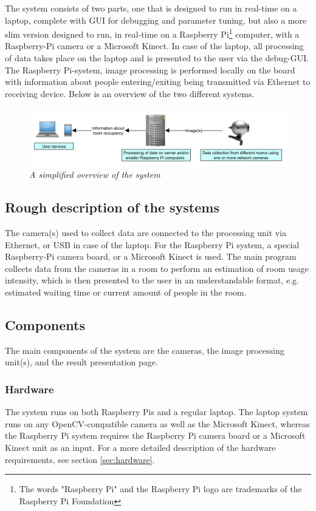 The system consists of two parts, one that is designed to run in real-time on a laptop, complete with GUI for debugging and parameter tuning, but also a more slim version designed to run, in real-time on a Raspberry Pi\footnote{The words "Raspberry Pi" and the Raspberry Pi logo are trademarks of the Raspberry Pi Foundation} computer, with a Raspberry-Pi camera or a Microsoft Kinect. In case of the laptop, all processing of data takes place on the laptop and is presented to the user via the debug-GUI. The Raspberry Pi-system, image processing is performed locally on the board with information about people entering/exiting being transmitted via Ethernet to receiving device. Below is an overview of the two different systems.

\vspace{0.5cm}
\begin{figure}[htb]
	\centering
	\includegraphics[width=170mm]{images/system_overview.png}
	\caption[System overview]{\textit{A simplified overview of the system}}
	\label{fig:block_overview2_fig}  %
\end{figure}

\subsection{Rough description of the systems}
The camera(s) used to collect data are connected to the processing unit via Ethernet, or USB in case of the laptop. For the Raspberry Pi system, a special Raspberry-Pi camera board, or a Microsoft Kinect is used. The main program collects data from the cameras in a room to perform an estimation of room usage intensity, which is then presented to the user in an understandable format, e.g. estimated waiting time or current amount of people in the room.
\newpage
\subsection{Components}
The main components of the system are the cameras, the image processing unit(s), and the result presentation page.

\subsubsection{Hardware}
The system runs on both Raspberry Pis and a regular laptop. The laptop system runs on any OpenCV-compatible camera as well as the Microsoft Kinect, whereas the Raspberry Pi system requires the Raspberry Pi camera board or a Microsoft Kinect unit as an input. For a more detailed description of the hardware requirements, see section \ref{sec:hardware}.

